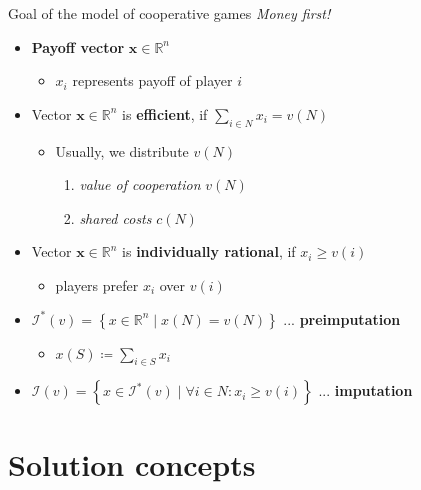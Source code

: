 \documentclass{beamer}
\newcommand{\Rn}[1][n]{\mathbb{R}^{#1}}
\newcommand{\bx}{\textbf{x}}
\newcommand{\I}{\mathcal{I}}
\begin{document}

\begin{frame}{Goal of the model of cooperative games}
	\textit{Money first!}
	\vspace{0.3in}
	\begin{itemize}
	    \item<2-> \textbf{Payoff vector} $\bx \in \Rn$
	    \begin{itemize}
	        \item<2-> $x_i$ represents payoff of player $i$
	    \end{itemize}
	    \item<3-> Vector $\bx \in \Rn$ is \textbf{efficient}, if $\sum_{i \in N}x_i = v(N)$
	    \begin{itemize}
	        \item<4-> Usually, we distribute $v(N)$
            \begin{enumerate}
                \item<4-> \textit{value of cooperation} $v(N)$
                \item<4-> \textit{shared costs} $c(N)$
            \end{enumerate}
	    \end{itemize}
	    \item<5-> Vector $\bx \in \Rn$ is \textbf{individually rational}, if $x_i \geq v(i)$
	    \begin{itemize}
	        \item<6-> players prefer $x_i$ over $v(i)$
	    \end{itemize}
	    \end{itemize}
	    \vspace{0.2in}
	    \begin{itemize}
	    \item<7-> $\I^*(v) = \left\{x \in \Rn \mid x(N) = v(N) \right\}$ ... \textbf{preimputation}
	    \begin{itemize}
	        \item<7-> $x(S)\coloneqq \sum_{i \in S} x_i$
	    \end{itemize}
	    \item<8-> $\I(v) = \left\{x \in \I^*(v) \mid \forall i \in N: x_i \geq v(i)\right\}$ ... \textbf{imputation}
	\end{itemize}
\end{frame}


\section{Solution concepts}
\end{document}
